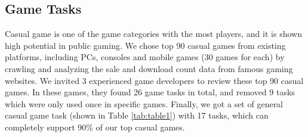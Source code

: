 \documentclass{sigchi}
\begin{document}
    \subsection {Game Tasks}
    Casual game is one of the game categories with the most players\cite{esa_ef_2014}, and it is shown high potential in public gaming\cite{Jurgelionis:2011:PET:2027456.2027462,Reis:2012:EMC:2405577.2405651,Biskupski:2014:DEB:2559206.2580097}. We chose top 90 casual games\cite{TopGames} from existing platforms, including PCs, consoles and mobile games (30 games for each) by crawling and analyzing the sale and download count data from famous gaming websites\cite{appannie,VGChartz,Steam,GameStop}. We invited 3 experienced game developers to review these top 90 casual games. In these games, they found 26 game tasks in total, and removed 9 tasks which were only used once in specific games. Finally, we got a set of general casual game task (shown in Table \ref{tab:table1}) with 17 tasks, which can completely support 90\% of our top casual games. 
\end{document}
